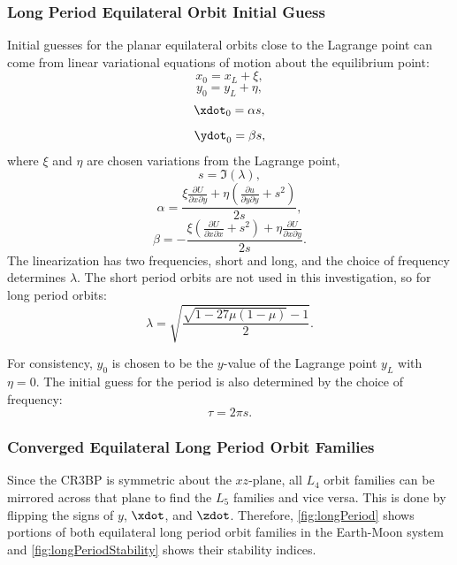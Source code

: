 \subsubsection{Long Period Equilateral Orbit Initial Guess}
Initial guesses for the planar equilateral orbits close to the Lagrange point can come from linear
variational equations of motion about the equilibrium point:
\begin{equation}
    x_{0}=x_{L}+\xi,
    \label{eq:xvareq}
\end{equation}
\begin{equation}
    y_{0}=y_{L}+\eta,
    \label{eq:yvareq}
\end{equation}
\begin{equation}
    \xdot_{0}=\alpha s,
    \label{eq:xdotvareq}
\end{equation}
\begin{equation}
    \ydot_{0}=\beta s,
    \label{eq:ydotvareq}
\end{equation}
where $\xi$ and $\eta$ are chosen variations from the Lagrange point,
\begin{equation}
    s=\Im(\lambda),
    \label{eq:seq}
\end{equation}
\begin{equation}
    \alpha=\frac{\xi\frac{\partial U}{\partial x\partial y}+\eta(\frac{\partial u}{\partial y\partial y}+s^{2})}{2s},
    \label{eq:alphaeq}
\end{equation}
\begin{equation}
    \beta=-\frac{\xi(\frac{\partial U}{\partial x\partial x}+s^{2})+\eta\frac{\partial U}{\partial x\partial y}}{2s}.
    \label{eq:betaeq}
\end{equation}
The linearization has two frequencies, short and long, and the choice of frequency determines
$\lambda$. The short period orbits are not used in this investigation, so for long period orbits:
\begin{equation}
    \lambda=\sqrt{\frac{\sqrt{1-27\mu(1-\mu)}-1}{2}}.
    \label{eq:lambdaeq}
\end{equation}

For consistency, $y_{0}$ is chosen to be the $y$-value of the Lagrange point $y_{L}$ with $\eta=0$.
The initial guess for the period is also determined by the choice of frequency:
\begin{equation}
    \tau=2\pi s.
    \label{eq:taueq}
\end{equation}

\subsubsection{Converged Equilateral Long Period Orbit Families}
Since the CR3BP is symmetric about the $xz$-plane, all $L_{4}$ orbit families can be mirrored
across that plane to find the $L_{5}$ families and vice versa. This is done by flipping the signs
of $y$, $\xdot$, and $\zdot$. Therefore, \cref{fig:longPeriod} shows portions of both equilateral
long period orbit families in the Earth-Moon system and \cref{fig:longPeriodStability} shows their
stability indices. 

